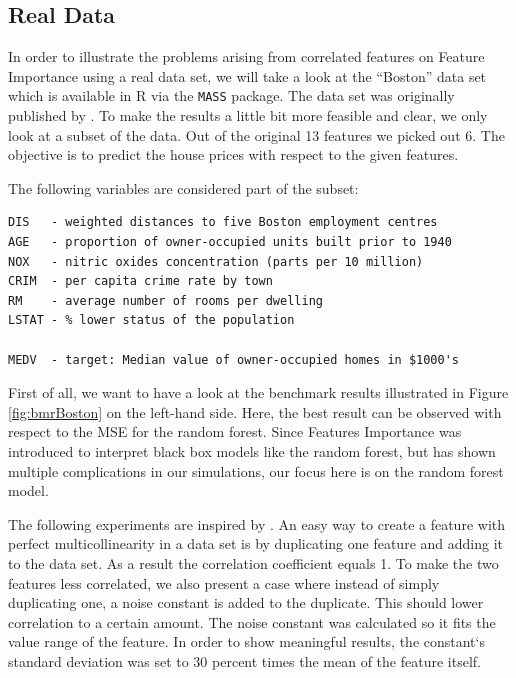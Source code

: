 \documentclass[]{krantz}
\begin{document}
\subsection{Real Data}\label{real-data}

In order to illustrate the problems arising from correlated features on
Feature Importance using a real data set, we will take a look at the
``Boston'' data set which is available in R via the \texttt{MASS}
package. The data set was originally published by \citet{harrison1978}.
To make the results a little bit more feasible and clear, we only look
at a subset of the data. Out of the original 13 features we picked out
6. The objective is to predict the house prices with respect to the
given features.

The following variables are considered part of the subset:

\begin{verbatim}
DIS   - weighted distances to five Boston employment centres
AGE   - proportion of owner-occupied units built prior to 1940
NOX   - nitric oxides concentration (parts per 10 million)
CRIM  - per capita crime rate by town
RM    - average number of rooms per dwelling
LSTAT - % lower status of the population

MEDV  - target: Median value of owner-occupied homes in $1000's
\end{verbatim}

First of all, we want to have a look at the benchmark results
illustrated in Figure \ref{fig:bmrBoston} on the left-hand side. Here,
the best result can be observed with respect to the MSE for the random
forest. Since Features Importance was introduced to interpret black box
models like the random forest, but has shown multiple complications in
our simulations, our focus here is on the random forest model.

The following experiments are inspired by \citet{parr2018}. An easy way
to create a feature with perfect multicollinearity in a data set is by
duplicating one feature and adding it to the data set. As a result the
correlation coefficient equals 1. To make the two features less
correlated, we also present a case where instead of simply duplicating
one, a noise constant is added to the duplicate. This should lower
correlation to a certain amount. The noise constant was calculated so it
fits the value range of the feature. In order to show meaningful
results, the constant`s standard deviation was set to 30 percent times
the mean of the feature itself.
\end{document}

